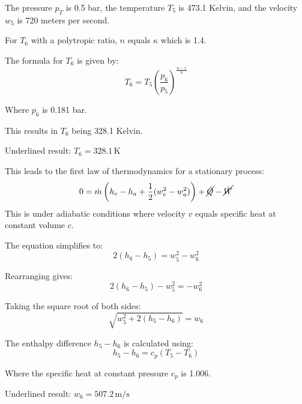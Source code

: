 The pressure \( p_T \) is 0.5 bar, the temperature \( T_5 \) is 473.1 Kelvin, and the velocity \( w_5 \) is 720 meters per second.

For \( T_6 \) with a polytropic ratio, \( n \) equals \( \kappa \) which is 1.4.

The formula for \( T_6 \) is given by:
\[ T_6 = T_5 \left( \frac{p_6}{p_5} \right)^{\frac{n-1}{n}} \]

Where \( p_6 \) is 0.181 bar.

This results in \( T_6 \) being 328.1 Kelvin.

Underlined result: \( T_6 = 328.1 \, \text{K} \)

This leads to the first law of thermodynamics for a stationary process:
\[ 0 = \dot{m} \left( h_e - h_a + \frac{1}{2} (w_e^2 - w_a^2) \right) + \cancel{\dot{Q}} - \cancel{\dot{W}} \]
This is under adiabatic conditions where velocity \( v \) equals specific heat at constant volume \( c \).

The equation simplifies to:
\[ 2(h_6 - h_5) = w_5^2 - w_6^2 \]

Rearranging gives:
\[ 2(h_6 - h_5) - w_5^2 = -w_6^2 \]

Taking the square root of both sides:
\[ \sqrt{w_5^2 + 2(h_5 - h_6)} = w_6 \]

The enthalpy difference \( h_5 - h_6 \) is calculated using:
\[ h_5 - h_6 = c_p (T_5 - T_6) \]

Where the specific heat at constant pressure \( c_p \) is 1.006.

Underlined result: \( w_6 = 507.2 \, \text{m/s} \)